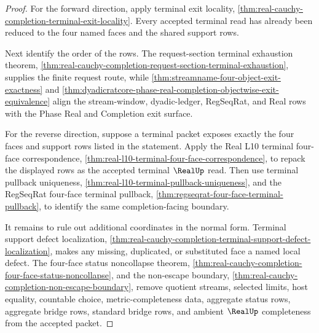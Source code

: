 \begin{proof}
For the forward direction, apply terminal exit locality, \autoref{thm:real-cauchy-completion-terminal-exit-locality}. Every accepted terminal read has already been reduced to the four named faces and the shared support rows.

Next identify the order of the rows. The request-section terminal exhaustion theorem, \autoref{thm:real-cauchy-completion-request-section-terminal-exhaustion}, supplies the finite request route, while \autoref{thm:streamname-four-object-exit-exactness} and \autoref{thm:dyadicratcore-phase-real-completion-objectwise-exit-equivalence} align the stream-window, dyadic-ledger, RegSeqRat, and Real rows with the Phase Real and Completion exit surface.

For the reverse direction, suppose a terminal packet exposes exactly the four faces and support rows listed in the statement. Apply the Real L10 terminal four-face correspondence, \autoref{thm:real-l10-terminal-four-face-correspondence}, to repack the displayed rows as the accepted terminal $\RealUp$ read. Then use terminal pullback uniqueness, \autoref{thm:real-l10-terminal-pullback-uniqueness}, and the RegSeqRat four-face terminal pullback, \autoref{thm:regseqrat-four-face-terminal-pullback}, to identify the same completion-facing boundary.

It remains to rule out additional coordinates in the normal form. Terminal support defect localization, \autoref{thm:real-cauchy-completion-terminal-support-defect-localization}, makes any missing, duplicated, or substituted face a named local defect. The four-face status noncollapse theorem, \autoref{thm:real-cauchy-completion-four-face-status-noncollapse}, and the non-escape boundary, \autoref{thm:real-cauchy-completion-non-escape-boundary}, remove quotient streams, selected limits, host equality, countable choice, metric-completeness data, aggregate status rows, aggregate bridge rows, standard bridge rows, and ambient $\RealUp$ completeness from the accepted packet.
\end{proof}

